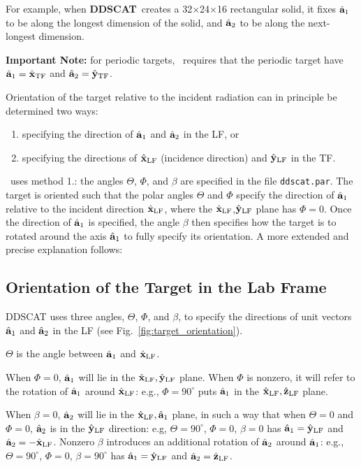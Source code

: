 For example, when {{\bf DDSCAT}}\ creates a 32$\times$24$\times$16
rectangular solid, it fixes ${\hat{\bf a}}_1$ to be along the longest
dimension of the solid, and ${\hat{\bf a}}_2$ to be along the
next-longest dimension.

{\bf Important Note:} for periodic targets, \ddscatv\ requires that the
periodic target have ${\hat{\bf a}}_1=\hat{\bf x}_{\rm TF}$ and ${\hat{\bf a}}_2=\hat{\bf y}_{\rm TF}$.

Orientation of the target relative to the incident radiation can in
principle be determined two ways:
\begin{enumerate}
\item specifying the direction of ${\hat{\bf a}}_1$ and 
      ${\hat{\bf a}}_2$ in the LF, or
\item specifying the directions of $\hat{\bf x}_{\rm LF}$ (incidence
	direction) and $\hat{\bf y}_{\rm LF}$ in the TF.
\end{enumerate}
\ddscat\ uses method 1.: the angles $\Theta$, $\Phi$, and
$\beta$ are specified in the file {\tt ddscat.par}.  The target is
oriented such that the polar angles $\Theta$ and $\Phi$ specify the
direction of ${\hat{\bf a}}_1$ relative to the incident direction
$\hat{\bf x}_{\rm LF}$, where the $\hat{\bf x}_{\rm LF}$,$\hat{\bf y}_{\rm LF}$ plane has
$\Phi=0$.  Once the direction of ${\hat{\bf a}}_1$ is specified, the
angle $\beta$ then specifies how the target is to rotated around the
axis ${\hat{\bf a}}_1$ to fully specify its orientation.  A more
extended and precise explanation follows:

\subsection{ Orientation of the Target in the Lab Frame}
DDSCAT uses three angles, $\Theta$, $\Phi$, and $\beta$, to specify
the directions of unit vectors ${\hat{\bf a}}_1$ and ${\hat{\bf a}}_2$
in the LF (see Fig.\ \ref{fig:target_orientation}).

$\Theta$ is the angle between ${\hat{\bf a}}_1$ and $\hat{\bf x}_{\rm LF}$.

When $\Phi=0$, ${\hat{\bf a}}_1$ will lie in the $\hat{\bf x}_{\rm LF},\hat{\bf y}_{\rm LF}$
plane.  When $\Phi$ is nonzero, it will refer to
the rotation of ${\hat{\bf a}}_1$ around $\hat{\bf x}_{\rm LF}$: e.g.,
$\Phi=90^\circ$ puts ${\hat{\bf a}}_1$ in the $\hat{\bf x}_{\rm LF},\hat{\bf z}_{\rm LF}$ plane.

When $\beta=0$, ${\hat{\bf a}}_2$ will lie in the 
$\hat{\bf x}_{\rm LF},{\hat{\bf a}}_1$ plane, in such a way that when $\Theta=0$ and
$\Phi=0$, ${\hat{\bf a}}_2$ is in the $\hat{\bf y}_{\rm LF}$ direction: e.g,
$\Theta=90^\circ$, $\Phi=0$, $\beta=0$ has 
${\hat{\bf a}}_1=\hat{\bf y}_{\rm LF}$ 
and ${\hat{\bf a}}_2=-\hat{\bf x}_{\rm LF}$.  Nonzero $\beta$ introduces
an additional rotation of ${\hat{\bf a}}_2$ around ${\hat{\bf a}}_1$:
e.g., $\Theta=90^\circ$, $\Phi=0$, $\beta=90^\circ$ has 
${\hat{\bf a}}_1=\hat{\bf y}_{\rm LF}$ and ${\hat{\bf a}}_2=\hat{\bf z}_{\rm LF}$.

